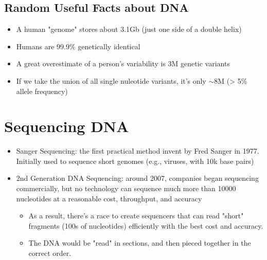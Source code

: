 \documentclass[10pt]{article}
\begin{document}
\subsection*{Random Useful Facts about DNA}
\begin{itemize}
    \item A human "genome" stores about 3.1Gb (just one side of a double helix)
    \item Humans are 99.9\% genetically identical
    \item A great overestimate of a person's variability is 3M genetic variants
    \item If we take the union of all single nuleotide variants, it's only $\sim$8M (> 5\% allele frequency)
\end{itemize}
\section*{Sequencing DNA}
\begin{itemize}
    \item Sanger Sequencing: the first practical method invent by Fred Sanger in 1977.  Initially used to sequence short genomes (e.g., viruses, with 10k base pairs)
    \item 2nd Generation DNA Sequencing: around 2007, companies began sequencing commercially, but no technology can sequence much more than 10000 nucleotides at a reasonable cost, throughput, and accuracy
    \begin{itemize}
        \item As a result, there's a race to create sequencers that can read "short" fragments (100s of nucleotides) efficiently with the best cost and accuracy.
        \item The DNA would be "read" in sections, and then pieced together in the correct order.
    \end{itemize}
\end{itemize}
\end{document}
